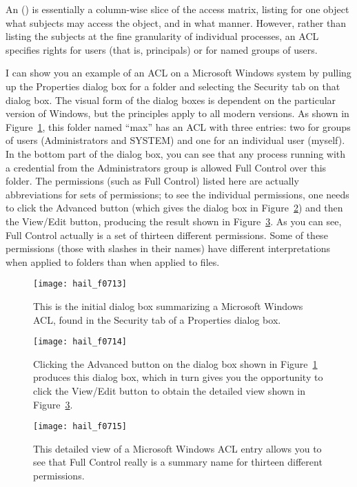 An  () is essentially a
column-wise slice of the access matrix, listing for one object what
subjects may access the object, and in what manner.  However, rather
than listing the subjects at the fine granularity of individual
processes, an ACL specifies rights for users (that is, principals) or
for named groups of users.

I can show you an example of an ACL on a Microsoft Windows system by
pulling up the Properties dialog box for a folder and selecting the Security tab on that dialog box.  The
visual form of the dialog boxes is dependent on the particular version of
Windows, but the principles apply to all modern versions.  As
shown in Figure~\ref{winacl-panel1}, this folder named
``max'' has an ACL with three
entries: two for groups of users (Administrators and SYSTEM) and one
for an individual user (myself).  In the bottom part of the dialog box, you
can see that any process running with a credential from the
Administrators group is allowed Full Control over this folder.  The
permissions (such as Full Control) listed here are actually
abbreviations for sets of permissions; to see the individual
permissions, one needs to click the Advanced button (which gives the
dialog box in Figure~\ref{winacl-panel2}) and then the View/Edit button,
producing the result shown in Figure~\ref{winacl-panel3}.  As you can
see, Full Control actually is a set of thirteen different permissions.  Some
of these permissions (those with slashes in their names) have
different interpretations when applied to folders than when applied to
files.
\begin{figure}
\centerline{\texttt{[image: hail\_f0713]}}
\caption{This is the initial dialog box summarizing a Microsoft Windows
  ACL, found in the Security tab of a Properties dialog box.}
\label{winacl-panel1}
\end{figure}
\begin{figure}
\centerline{\texttt{[image: hail\_f0714]}}
\caption{Clicking the Advanced button on the dialog box shown in
  Figure~\ref{winacl-panel1} produces this dialog box, which in turn
  gives you the opportunity to click the View/Edit button to obtain
  the detailed view shown in Figure~\ref{winacl-panel3}.}
\label{winacl-panel2}
\end{figure}
\begin{figure}
\centerline{\texttt{[image: hail\_f0715]}}
\caption{This detailed view of a Microsoft Windows
  ACL entry allows you to see that Full Control really is a summary
  name for thirteen different permissions.}
\label{winacl-panel3}
\end{figure}

